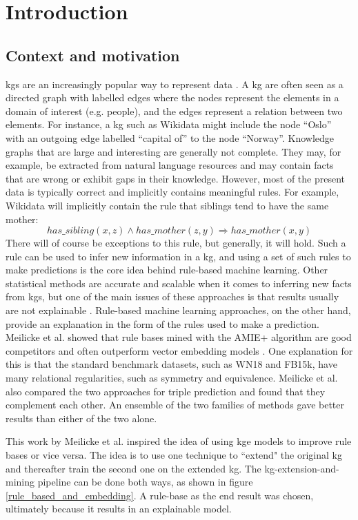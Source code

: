 \chapter{Introduction}
\section{Context and motivation}
\Glspl{kg} are an increasingly popular way to represent data \cite{hogan2020knowledge}.
A \gls{kg} are often seen as a directed graph with labelled edges where the nodes represent the elements in a domain of interest (e.g. people), and the edges represent a relation between two elements. For instance, a \gls{kg} such as Wikidata might include the node ``Oslo'' with an outgoing edge labelled ``capital of'' to the node ``Norway''. Knowledge graphs that are large and interesting are generally not complete. They may, for example, be extracted from natural language resources and may contain facts that are wrong or exhibit gaps in their knowledge. However, most of the present data is typically correct and implicitly contains meaningful rules. For example, Wikidata will implicitly contain the rule that siblings tend to have the same mother:
\[has\_sibling(x, z) \wedge has\_mother(z, y) \Rightarrow has\_mother(x, y)\]
There will of course be exceptions to this rule, but generally, it will hold. Such a rule can be used to infer new information in a \gls{kg}, and using a set of such rules to make predictions is the core idea behind rule-based machine learning. Other statistical methods are accurate and scalable when it comes to inferring new facts from \glspl{kg}, but one of the main issues of these approaches is that results usually are not explainable \cite{bonatti2019knowledge}. Rule-based machine learning approaches, on the other hand, provide an explanation in the form of the rules used to make a prediction. Meilicke et al. showed that rule bases mined with the AMIE+ algorithm are good competitors and often outperform vector embedding models \cite{ensemble}. One explanation for this is that the standard benchmark datasets, such as WN18 and FB15k,  have many relational regularities, such as symmetry and equivalence. Meilicke et al. also compared the two approaches for triple prediction and found that they complement each other. An ensemble of the two families of methods gave better results than either of the two alone.

This work by Meilicke et al. inspired the idea of using \gls{kge} models to improve rule bases or vice versa. The idea is to use one technique to ``extend" the original \gls{kg} and thereafter train the second one on the extended \gls{kg}. The \gls{kg}-extension-and-mining pipeline can be done both ways, as shown in figure \ref{rule_based_and_embedding}. A rule-base as the end result was chosen, ultimately because it results in an explainable model.

